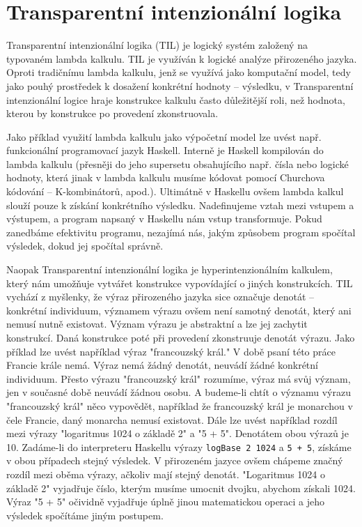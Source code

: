 \chapter{Transparentní intenzionální logika}
\label{sec:TILIntroduction}

Transparentní intenzionální logika (TIL) je logický systém založený na typovaném lambda kalkulu.
TIL je využíván k logické analýze přirozeného jazyka. Oproti tradičnímu lambda kalkulu, jenž
se využívá jako komputační model, tedy jako pouhý prostředek k dosažení konkrétní hodnoty --
výsledku, v Transparentní intenzionální logice hraje konstrukce kalkulu často důležitější roli,
než hodnota, kterou by konstrukce po provedení zkonstruovala.

Jako příklad využití lambda kalkulu jako výpočetní model lze uvést např. funkcionální programovací
jazyk Haskell. Interně je Haskell kompilován do lambda kalkulu (přesněji do jeho supersetu
obsahujícího např. čísla nebo logické hodnoty, která jinak v lambda kalkulu musíme kódovat pomocí
Churchova kódování -- K-kombinátorů, apod.). Ultimátně v Haskellu ovšem lambda kalkul slouží pouze
k získání konkrétního výsledku. Nadefinujeme vztah mezi vstupem a výstupem, a program napsaný
v Haskellu nám vstup transformuje. Pokud zanedbáme efektivitu programu, nezajímá nás, jakým
způsobem program spočítal výsledek, dokud jej spočítal správně.

Naopak Transparentní intenzionální logika je hyperintenzionálním kalkulem, který nám umožňuje
vytvářet konstrukce vypovídající o jiných konstrukcích. TIL vychází z myšlenky, že výraz
přirozeného jazyka sice označuje denotát -- konkrétní individuum, významem výrazu ovšem není
samotný denotát, který ani nemusí nutně existovat. Význam výrazu je abstraktní a lze jej zachytit
konstrukcí. Daná konstrukce poté při provedení zkonstruuje denotát výrazu. Jako příklad lze uvést
například výraz "francouzský král." V době psaní této práce Francie krále nemá. Výraz nemá žádný
denotát, neuvádí žádné konkrétní individuum. Přesto výrazu "francouzský král" rozumíme, výraz má
svůj význam, jen v současné době neuvádí žádnou osobu. A budeme-li chtít o významu výrazu
"francouzský král" něco vypovědět, například že francouzský král je monarchou v čele Francie,
daný monarcha nemusí existovat. Dále lze uvést například rozdíl mezi výrazy "logaritmus 1024
o základě 2" a "5 + 5". Denotátem obou výrazů je 10. Zadáme-li do interpreteru Haskellu výrazy
\lstset{language=Haskell}
\lstinline{logBase 2 1024} a \lstinline{5 + 5}, získáme v obou případech stejný výsledek.
V přirozeném jazyce ovšem chápeme značný rozdíl mezi oběma výrazy, ačkoliv mají stejný denotát.
"Logaritmus 1024 o základě 2" vyjadřuje číslo, kterým musíme umocnit dvojku, abychom získali 1024.
Výraz "5 + 5" očividně vyjadřuje úplně jinou matematickou operaci a jeho výsledek spočítáme jiným
postupem.

